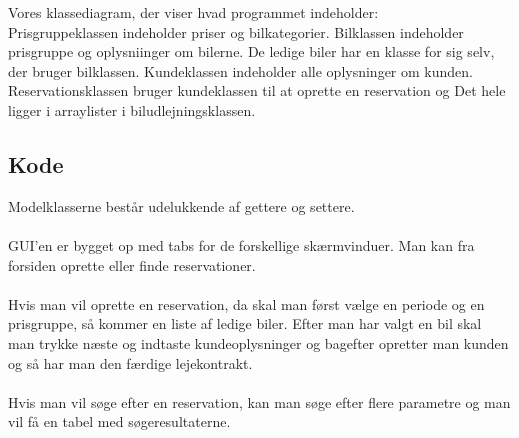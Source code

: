 \documentclass[11pt]{article}
\begin{document}
Vores klassediagram, der viser hvad programmet indeholder:\\
Prisgruppeklassen indeholder priser og bilkategorier. Bilklassen indeholder prisgruppe og oplysniinger om bilerne. De ledige biler har en klasse for sig selv, der bruger bilklassen. Kundeklassen indeholder alle oplysninger om kunden. Reservationsklassen bruger kundeklassen til at oprette en reservation og Det hele ligger i arraylister i biludlejningsklassen.

\subsection*{Kode}
Modelklasserne består udelukkende af gettere og settere.\\\\
GUI'en er bygget op med tabs for de forskellige skærmvinduer. Man kan fra forsiden oprette eller finde reservationer.\\\\
Hvis man vil oprette en reservation, da skal man først vælge en periode og en prisgruppe, så kommer en liste af ledige biler. Efter man har valgt en bil skal man trykke næste og indtaste kundeoplysninger og bagefter opretter man kunden og så har man den færdige lejekontrakt.\\\\
Hvis man vil søge efter en reservation, kan man søge efter flere parametre og man vil få en tabel med søgeresultaterne.
\end{document}
